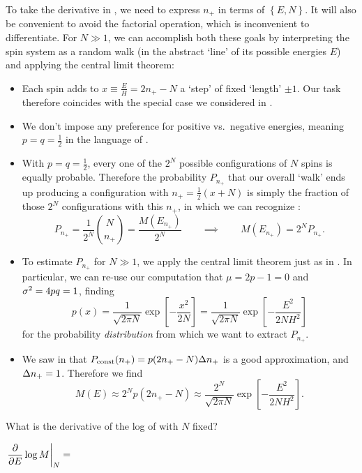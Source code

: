To take the derivative in , we need to express $n_+$ in terms of $\left\{E, N\right\}$.
It will also be convenient to avoid the factorial operation, which is inconvenient to differentiate.
For $N \gg 1$, we can accomplish both these goals by interpreting the spin system as a random walk (in the abstract `line' of its possible energies $E$) and applying the central limit theorem: \\[-24 pt]
\begin{itemize}
  \item Each spin adds to $x \equiv \frac{E}{H} = 2n_+ - N$ a `step' of fixed `length' $\pm 1$.
        Our task therefore coincides with the special case we considered in .
  \item We don't impose any preference for positive vs.\ negative energies, meaning $p = q = \frac{1}{2}$ in the language of .
  \item With $p = q = \frac{1}{2}$, every one of the $2^N$ possible configurations of $N$ spins is equally probable.
        Therefore the probability $P_{n_+}$ that our overall `walk' ends up producing a configuration with $n_+ = \frac{1}{2}\left(x + N\right)$ is simply the fraction of those $2^N$ configurations with this $n_+$, in which we can recognize :
        \begin{equation*}
          P_{n_+} = \frac{1}{2^N} \binom{N}{n_+} = \frac{M(E_{n_+})}{2^N} \qquad \implies \qquad M(E_{n_+}) = 2^N P_{n_+}.
        \end{equation*}
  \item To estimate $P_{n_+}$ for $N \gg 1$, we apply the central limit theorem just as in .
        In particular, we can re-use our computation that $\mu = 2p - 1 = 0$ and $\sigma^2 = 4pq = 1$, finding
        \begin{equation*}
          p(x) = \frac{1}{\sqrt{2\pi N}}\exp\left[-\frac{x^2}{2N}\right] = \frac{1}{\sqrt{2\pi N}}\exp\left[-\frac{E^2}{2NH^2}\right]
        \end{equation*}
        for the probability \textit{distribution} from which we want to extract $P_{n_+}$.
  \item We saw in  that $P_{\text{const}}(n_+) = p(2n_+ - N) \Delta n_+$ is a good approximation, and $\Delta n_+ = 1$.
        Therefore we find
        \begin{equation}
          \label{eq:CLT_states}
          M(E) \approx 2^N p(2n_+ - N) \approx \frac{2^N}{\sqrt{2\pi N}}\exp\left[-\frac{E^2}{2NH^2}\right].
        \end{equation}
\end{itemize}
What is the derivative of the log of  with $N$ fixed?
\begin{mdframed}
  $\displaystyle \left.\frac{\partial }{\partial E} \log M\right|_N = $ \\[100 pt]
\end{mdframed}


